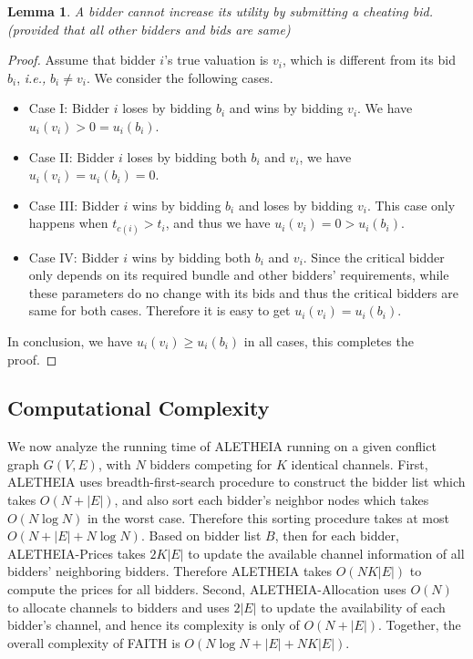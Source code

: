 \documentclass{sig-alternate}
\newtheorem{theorem}{Theorem}
\newtheorem{lemma}{Lemma}
\begin{document}
\begin{lemma}
\label{lm_mid}
A bidder cannot increase its utility by submitting a cheating bid. (provided that all other bidders and bids are same)
\end{lemma}
\begin{proof}
Assume that bidder $i$'s true valuation is $v_i$, which is different from its bid $b_i$, \emph{i.e.,} $b_i \neq v_i$. We consider the following cases.
\begin{itemize}
\item Case I: Bidder $i$ loses by bidding $b_i$ and wins by bidding $v_i$. We have $u_i(v_i)> 0 = u_i(b_i)$.
 \item Case II: Bidder $i$ loses by bidding both $b_i$ and $v_i$, we have $u_i(v_i)= u_i(b_i)=0$.
 \item Case III: Bidder $i$ wins by bidding $b_i$ and loses by bidding $v_i$. This case only happens when $t_{c(i)} > t_i$, and thus we have $u_i(v_i) = 0 > u_i(b_i)$.
 \item Case IV: Bidder $i$ wins by bidding both $b_i$ and $v_i$. Since the critical bidder only depends on its required bundle and other bidders' requirements, while these parameters do no change with its bids and thus the critical bidders are same for both cases. Therefore it is easy to get $u_i(v_i) = u_i(b_i)$.
\end{itemize}

In conclusion, we have $u_i(v_i) \ge u_i(b_i)$ in all cases, this completes the proof.
\end{proof}


\subsection{Computational Complexity}
We now analyze the running time of ALETHEIA running on a given conflict graph $G(V,E)$, with $N$ bidders competing for $K$ identical channels. First, ALETHEIA uses breadth-first-search procedure to construct the bidder list which takes $O(N+|E|)$, and also sort each bidder's neighbor nodes which takes $O(N\log N)$ in the worst case. Therefore this sorting procedure takes at most $O(N+|E|+N\log N)$. Based on bidder list $B$, then for each bidder, ALETHEIA-Prices takes $2K|E|$ to update the available channel information of all bidders' neighboring bidders. Therefore ALETHEIA takes $O(NK|E|)$ to compute the prices for all bidders. Second, ALETHEIA-Allocation uses $O(N)$ to allocate channels to bidders and uses $2|E|$ to update the availability of each bidder's channel, and hence its complexity is only of $O(N+|E|)$. Together, the overall complexity of FAITH is $O(N\log N + |E|+ NK|E|)$. %
\end{document}
